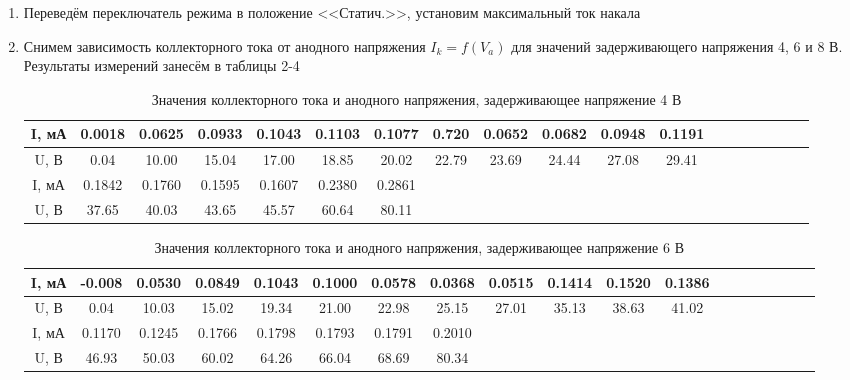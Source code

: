 \documentclass[a4paper, 12pt]{article}
\begin{document}
\begin{enumerate}
    \item Переведём переключатель режима в положение <<Статич.>>, установим максимальный ток накала
    \item Снимем зависимость коллекторного тока от анодного напряжения $I_k = f(V_a)$ для значений задерживающего напряжения 4, 6 и 8 В. Результаты измерений занесём в таблицы 2-4
    
    \begin{table}[h]
    \centering
    \begin{center}
    \caption{Значения коллекторного тока и анодного напряжения, задерживающее напряжение 4 В}
    \end{center}
    \vspace{0.1cm}
    \label{tab:my_label}
    \begin{tabular}{|c|c|c|c|c|c|c|c|c|c|c|c|c|c|c|c|c|c|c|} \hline
I, мА & 0.0018 & 0.0625 & 0.0933 & 0.1043 & 0.1103 & 0.1077 & 0.720 & 0.0652 & 0.0682 & 0.0948 & 0.1191 \\ \hline
U, В & 0.04 & 10.00 & 15.04 & 17.00 & 18.85 & 20.02 & 22.79 & 23.69 & 24.44 & 27.08 & 29.41 \\ \hline 
\hline
I, мА & 0.1842 & 0.1760 & 0.1595 & 0.1607 & 0.2380 & 0.2861 & & & & & \\ \hline
U, В  & 37.65 & 40.03 & 43.65 & 45.57 & 60.64 & 80.11 & & & & & \\ \hline

\end{tabular}
\end{table}

    \begin{table}[h]
    \centering
    \begin{center}
    \caption{Значения коллекторного тока и анодного напряжения, задерживающее напряжение 6 В}
    \end{center}
    \vspace{0.1cm}
    \label{tab:my_label}
    \begin{tabular}{|c|c|c|c|c|c|c|c|c|c|c|c|c|c|c|c|c|c|c|} \hline
I, мА & -0.008 & 0.0530 & 0.0849 & 0.1043 & 0.1000 & 0.0578 & 0.0368 & 0.0515 & 0.1414 & 0.1520 & 0.1386 \\ \hline
U, В & 0.04 & 10.03 & 15.02 & 19.34 & 21.00 & 22.98 & 25.15 & 27.01 & 35.13 & 38.63 & 41.02 \\ \hline
\hline
I, мА & 0.1170 & 0.1245 & 0.1766 & 0.1798 & 0.1793 & 0.1791 & 0.2010 & & & & \\ \hline
U, В & 46.93 & 50.03 & 60.02 & 64.26 & 66.04 & 68.69 & 80.34 & & & & \\ \hline


\end{tabular}
\end{table}
\end{enumerate}
\end{document}
